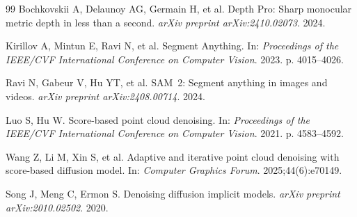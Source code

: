\documentclass[pdflatex,sn-mathphys-num]{sn-jnl}
\begin{document}
\begin{thebibliography}{99}
Bochkovskii A, Delaunoy AG, Germain H, et al. Depth Pro: Sharp monocular metric depth in less than a second. \textit{arXiv preprint arXiv:2410.02073}. 2024.

Kirillov A, Mintun E, Ravi N, et al. Segment Anything. In: \textit{Proceedings of the IEEE/CVF International Conference on Computer Vision}. 2023. p. 4015--4026.

Ravi N, Gabeur V, Hu YT, et al. SAM~2: Segment anything in images and videos. \textit{arXiv preprint arXiv:2408.00714}. 2024.

Luo S, Hu W. Score-based point cloud denoising. In: \textit{Proceedings of the IEEE/CVF International Conference on Computer Vision}. 2021. p. 4583--4592.

Wang Z, Li M, Xin S, et al. Adaptive and iterative point cloud denoising with score-based diffusion model. In: \textit{Computer Graphics Forum}. 2025;44(6):e70149.

Song J, Meng C, Ermon S. Denoising diffusion implicit models. \textit{arXiv preprint arXiv:2010.02502}. 2020.

\end{thebibliography}
\end{document}
